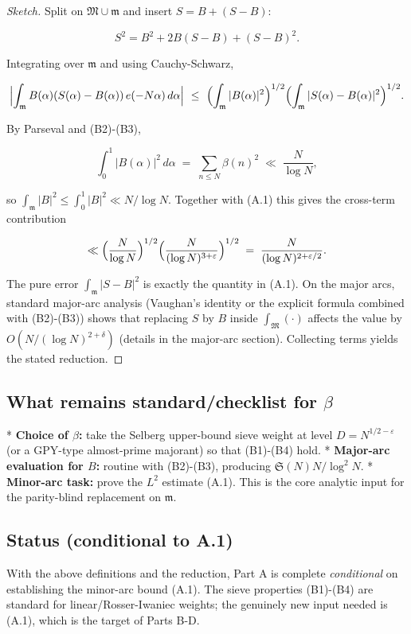 \documentclass[11pt]{article}
\theoremstyle{definition}
\theoremstyle{remark}
\begin{document}
\begin{proof}[Sketch]
Split on $\mathfrak M\cup\mathfrak m$ and insert $S=B+(S-B)$:

$$
S^2 = B^2 + 2B(S-B) + (S-B)^2.
$$

Integrating over $\mathfrak m$ and using Cauchy-Schwarz,

$$
\Bigl|\int_{\mathfrak m} B(\alpha)(S(\alpha)-B(\alpha))\,e(-N\alpha)\,d\alpha\Bigr|
\ \le\ \Bigl(\int_{\mathfrak m}|B(\alpha)|^2\Bigr)^{1/2}
      \Bigl(\int_{\mathfrak m}|S(\alpha)-B(\alpha)|^2\Bigr)^{1/2}.
$$

By Parseval and (B2)-(B3),

$$
\int_0^1 |B(\alpha)|^2\,d\alpha \;=\; \sum_{n\le N}\beta(n)^2 \;\ll\; \frac{N}{\log N},
$$

so $\int_{\mathfrak m}|B|^2\le\int_0^1|B|^2\ll N/\log N$. Together with (A.1) this gives the cross-term contribution

$$
\ll \Bigl(\frac{N}{\log N}\Bigr)^{1/2}\Bigl(\frac{N}{(\log N)^{3+\varepsilon}}\Bigr)^{1/2}
\;=\;\frac{N}{(\log N)^{2+\varepsilon/2}}.
$$

The pure error $\int_{\mathfrak m}|S-B|^2$ is exactly the quantity in (A.1). On the major arcs, standard major-arc analysis (Vaughan’s identity or the explicit formula combined with (B2)-(B3)) shows that replacing $S$ by $B$ inside $\int_{\mathfrak M}(\cdot)$ affects the value by $O(N/(\log N)^{2+\delta})$ (details in the major-arc section). Collecting terms yields the stated reduction.
\end{proof}

\subsection*{What remains standard/checklist for $\beta$}

* \textbf{Choice of $\beta$:} take the Selberg upper-bound sieve weight at level $D=N^{1/2-\varepsilon}$ (or a GPY-type almost-prime majorant) so that (B1)-(B4) hold.
* \textbf{Major-arc evaluation for $B$:} routine with (B2)-(B3), producing $\mathfrak S(N)N/\log^2 N$.
* \textbf{Minor-arc task:} prove the $L^2$ estimate (A.1). This is the core analytic input for the parity-blind replacement on $\mathfrak m$.


\subsection*{Status (conditional to A.1)} 
With the above definitions and the reduction, Part A is complete \emph{conditional} on establishing the minor-arc bound (A.1). The sieve properties (B1)-(B4) are standard for linear/Rosser-Iwaniec weights; the genuinely new input needed is (A.1), which is the target of Parts B-D.
\end{document}
